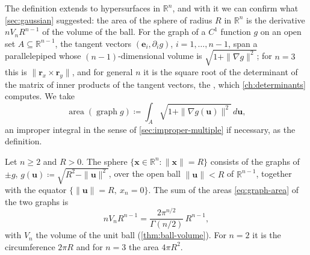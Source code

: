 The definition extends to hypersurfaces in $\mathbb R^n$, and with it we can confirm what \cref{sec:gaussian} suggested: the area of the sphere of radius $R$ in $\mathbb R^n$ is the derivative $nV_nR^{n-1}$ of the volume of the ball. For the graph of a $C^1$ function $g$ on an open set $A\subseteq\mathbb R^{n-1}$, the tangent vectors $(\mathbf e_i,\partial_ig)$, $i=1,\ldots,n-1$, span a parallelepiped whose $(n-1)$-dimensional volume is $\sqrt{1+\|\nabla g\|^2}$; for $n=3$ this is $\|\mathbf r_x\times\mathbf r_y\|$, and for general $n$ it is the square root of the determinant of the matrix of inner products of the tangent vectors, the , which \cref{ch:determinants} computes. We take
\begin{equation}
\operatorname{area}(\operatorname{graph}g)\coloneqq\int_A\sqrt{1+\|\nabla g(\mathbf u)\|^2}\,d\mathbf u ,
\label{eq:graph-area}
\end{equation}
an improper integral in the sense of \cref{sec:improper-multiple} if necessary, as the definition.

\begin{proposition}
\label{prop:sphere-area}
Let $n\ge2$ and $R>0$. The sphere $\{\mathbf x\in\mathbb R^n: \|\mathbf x\|=R\}$ consists of the graphs of $\pm g$, $g(\mathbf u)\coloneqq\sqrt{R^2-\|\mathbf u\|^2}$, over the open ball $\|\mathbf u\|<R$ of $\mathbb R^{n-1}$, together with the equator $\{\|\mathbf u\|=R,\ x_n=0\}$. The sum of the areas \eqref{eq:graph-area} of the two graphs is
\[
nV_nR^{n-1}=\frac{2\pi^{n/2}}{\Gamma(n/2)}\,R^{n-1},
\]
with $V_n$ the volume of the unit ball (\cref{thm:ball-volume}). For $n=2$ it is the circumference $2\pi R$ and for $n=3$ the area $4\pi R^2$.
\end{proposition}

